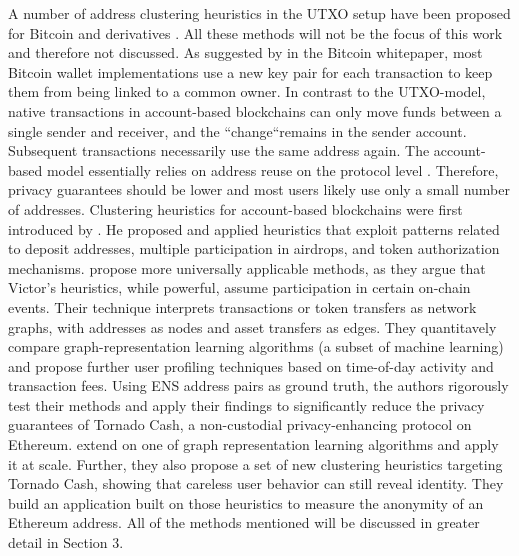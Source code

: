 \documentclass[12pt,a4paper,titlepage,oneside,english]{article}
\begin{document}
A number of address clustering heuristics in the UTXO setup have been proposed for Bitcoin and derivatives \citep{Androulaki2013, Meiklejohn2013, Haslhofer2016, jourdan2018, kappos2022}. All these methods will not be the focus of this work and therefore not discussed. As suggested by \cite{nakamotoBitcoin2008} in the Bitcoin whitepaper, most Bitcoin wallet implementations use a new key pair for each transaction to keep them from being linked to a common owner. \newline
In contrast to the UTXO-model, native transactions in account-based blockchains can only move funds between a single sender and receiver, and the ``change``remains in the sender account. Subsequent transactions necessarily use the same address again. The account-based model essentially relies on address reuse on the protocol level \citep{Beres2020}. Therefore, privacy guarantees should be lower and most users likely use only a small number of addresses. \newline
Clustering heuristics for account-based blockchains were first introduced by \cite{FV:17}. He proposed and applied heuristics that exploit patterns related to deposit addresses, multiple participation in airdrops, and token authorization mechanisms. \newline
\cite{Beres2020} propose more universally applicable methods, as they argue that Victor’s heuristics, while powerful, assume participation in certain on-chain events. Their technique interprets transactions or token transfers as network graphs, with addresses as nodes and asset transfers as edges. They quantitavely compare graph-representation learning algorithms (a subset of machine learning) and propose further user profiling techniques based on time-of-day activity and transaction fees. Using ENS address pairs as ground truth, the authors rigorously test their methods and apply their findings to significantly reduce the privacy guarantees of Tornado Cash, a non-custodial privacy-enhancing protocol on Ethereum. \newline
\cite{wu2022tutela} extend on one of \cite{Beres2020} graph representation learning %
 algorithms and apply it at scale. Further, they also propose a set of new clustering heuristics targeting Tornado Cash,  showing that careless user behavior can still reveal identity. They build an application built on those heuristics to measure the anonymity of an Ethereum address. All of the methods mentioned will be discussed in greater detail in Section 3. \newline
\end{document}
